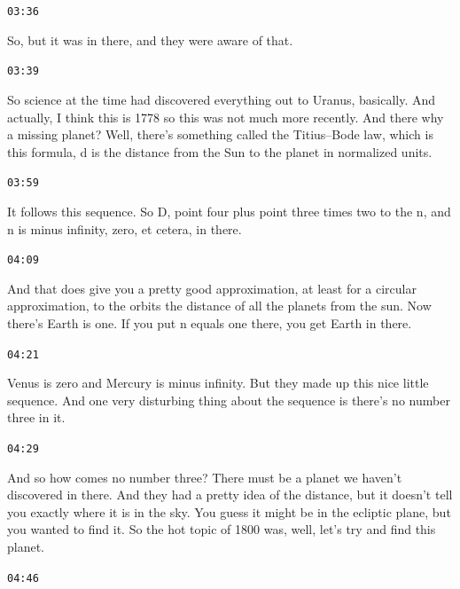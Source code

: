 \documentclass[11pt,a4paper]{article}
\newcommand{\timestamp}[1]{%
  \par\vspace{0.35em}%
  \noindent\colorbox{timestampback}{\textcolor{timestampblue}{\small\texttt{#1}}}%
  \par\vspace{0.2em}%
}
\begin{document}
\timestamp{03:36}

So, but it was in there, and they were aware of that.



\timestamp{03:39}

So science at the time had discovered everything out to Uranus, basically. And actually, I think this is 1778 so this was not much more recently. And there why a missing planet? Well, there's something called the Titius--Bode law, which is this formula, d is the distance from the Sun to the planet in normalized units.



\timestamp{03:59}

It follows this sequence. So D, point four plus point three times two to the n, and n is minus infinity, zero, et cetera, in there.



\timestamp{04:09}

And that does give you a pretty good approximation, at least for a circular approximation, to the orbits the distance of all the planets from the sun. Now there's Earth is one. If you put n equals one there, you get Earth in there.



\timestamp{04:21}

Venus is zero and Mercury is minus infinity. But they made up this nice little sequence. And one very disturbing thing about the sequence is there's no number three in it.



\timestamp{04:29}

And so how comes no number three? There must be a planet we haven't discovered in there. And they had a pretty idea of the distance, but it doesn't tell you exactly where it is in the sky. You guess it might be in the ecliptic plane, but you wanted to find it. So the hot topic of 1800 was, well, let's try and find this planet.



\timestamp{04:46}
\end{document}
